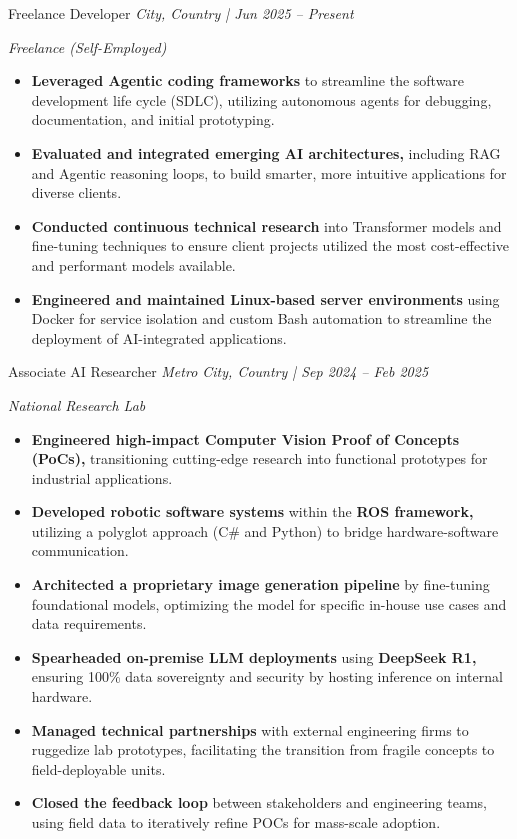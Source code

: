 \documentclass[11pt]{article}
\newcommand{\job}[3]{%
  \vspace{4pt}%
  {\fontsize{9pt}{12pt}\poppinsmedium\color{accent}#1}%
  \hfill
  {\fontsize{9pt}{12pt}\poppinslight\itshape #2}\par
  {\fontsize{9pt}{12pt}\poppinslight\itshape #3}\par
}
\begin{document}
\job{Freelance Developer}{City, Country | Jun 2025 -- Present}{Freelance (Self-Employed)}
\begin{itemize}
  \item \textbf{Leveraged Agentic coding frameworks} to streamline the software
        development life cycle (SDLC), utilizing autonomous agents for
        debugging, documentation, and initial prototyping.
  \item \textbf{Evaluated and integrated emerging AI architectures,} including RAG
        and Agentic reasoning loops, to build smarter, more intuitive
        applications for diverse clients.
  \item \textbf{Conducted continuous technical research} into Transformer models and
        fine-tuning techniques to ensure client projects utilized the most
        cost-effective and performant models available.
  \item \textbf{Engineered and maintained Linux-based server environments} using
        Docker for service isolation and custom Bash automation to streamline
        the deployment of AI-integrated applications.
\end{itemize}

\job{Associate AI Researcher}{Metro City, Country | Sep 2024 -- Feb 2025}{National Research Lab}
\begin{itemize}
  \item \textbf{Engineered high-impact Computer Vision Proof of Concepts (PoCs),}
        transitioning cutting-edge research into functional prototypes for
        industrial applications.
  \item \textbf{Developed robotic software systems} within the
        \textbf{ROS framework,} utilizing a polyglot approach (C\# and Python)
        to bridge hardware-software communication.
  \item \textbf{Architected a proprietary image generation pipeline}
        by fine-tuning foundational models, optimizing the model for specific
        in-house use cases and data requirements.
  \item \textbf{Spearheaded on-premise LLM deployments} using
        \textbf{DeepSeek R1,} ensuring 100\% data sovereignty and security by
        hosting inference on internal hardware.
  \item \textbf{Managed technical partnerships} with external engineering firms
        to ruggedize lab prototypes, facilitating the transition from fragile
        concepts to field-deployable units.
  \item \textbf{Closed the feedback loop} between stakeholders and engineering
        teams, using field data to iteratively refine POCs for mass-scale adoption.
\end{itemize}
\end{document}
